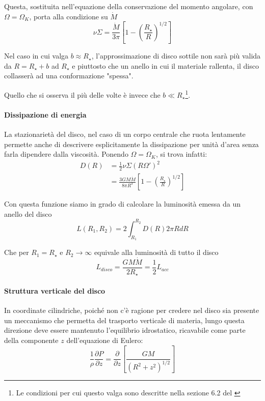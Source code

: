 \documentclass[a4paperbi]{article}
\begin{document}
	Questa, sostituita nell'equazione della conservazione del momento angolare, con $\Omega=\Omega_K$, porta alla condizione su $\dot{M}$
	\begin{equation}
		\nu\Sigma=\frac{\dot{M}}{3\pi}\left[1-\left(\frac{R_{\star}}{R}\right)^{1/2}\right]
	\end{equation}
	
	Nel caso in cui valga $b\approx R_{\star}$, l'approssimazione di disco sottile non sarà più valida da $R=R_{\star}+b$ ad $R_{\star}$ e piuttosto che un anello in cui il materiale rallenta, il disco collasserà ad una conformazione "spessa".
	
	Quello che si osserva il più delle volte è invece che $b\ll R_{\star}$\footnote{Le condizioni per cui questo valga sono descritte nella sezione 6.2 del \cite{FrankKingRaineAccretionPower}}.	
	
	\paragraph{Dissipazione di energia}
	La stazionarietà del disco, nel caso di un corpo centrale che ruota lentamente permette anche di descrivere esplicitamente la dissipazione per unità d'area senza farla dipendere dalla viscosità. Ponendo $\Omega=\Omega_K$, si trova infatti:
	\begin{align}
		D(R)&=\frac{1}{2}\nu\Sigma(R\Omega')^2
			\\&=\frac{3GM\dot{M}}{8\pi R^3}\left[1-\left(\frac{R_{\star}}{R}\right)^{1/2}\right]
	\end{align}	
	
	Con questa funzione siamo in grado di calcolare la luminosità emessa da un anello del disco
	\begin{equation}
		L(R_1,R_2)=2\int_{R_1}^{R_2}D(R)2\pi RdR
	\end{equation}
	
	Che per $R_1=R_{\star}$ e $R_2\to\infty$ equivale alla luminosità di tutto il disco
	\begin{equation}
		L_{disco}=\frac{GM\dot{M}}{2R_{\star}}=\frac{1}{2}L_{acc}
	\end{equation}
	
	\paragraph{Struttura verticale del disco}
	In coordinate cilindriche, poiché non c'è ragione per credere nel disco sia presente un meccanismo che permetta del trasporto verticale di materia, lungo questa direzione deve essere mantenuto l'equilibrio idrostatico, ricavabile come parte della componente $z$ dell'equazione di Eulero:
	\begin{equation*}
		\frac{1}{\rho}\frac{\partial P}{\partial z}=\frac{\partial}{\partial z}\left[\frac{GM}{(R^2+z^2)^{1/2}}\right]
	\end{equation*}
	
\end{document}
